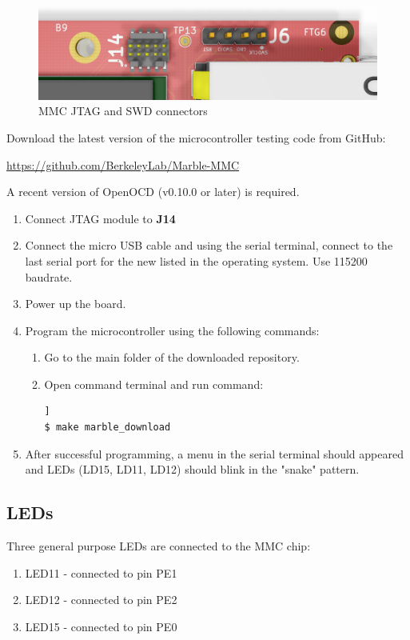 \documentclass[12pt,oneside,a4]{article}
\begin{document}
\begin{figure}[H]
\begin{center}
\includegraphics[width=1\linewidth]{mmcjtagswd.png}
 \caption{MMC JTAG and SWD connectors}\label{mmcjtagswd}
\end{center}
\end{figure}

Download the latest version of the microcontroller testing code from GitHub:
\begin{leftbar}
\url{https://github.com/BerkeleyLab/Marble-MMC}
\end{leftbar}

A recent version of OpenOCD (v0.10.0 or later) is required.
\begin{enumerate}
	\item Connect JTAG module to \textbf{J14}
	\item Connect the micro USB cable and using the serial terminal, connect to the last serial port for the new listed in the operating system. Use 115200 baudrate.
	\item Power up the board.
	\item Program the microcontroller using the following commands:
	\begin{enumerate}
	\item Go to the main folder of the downloaded repository.
	\item Open command terminal and run command:
	\begin{lstlisting}[backgroundcolor = \color{Gainsboro}, language=bash, frame=none]]
$ make marble_download
	\end{lstlisting}
	\end{enumerate}
	\item After successful programming, a menu in the serial terminal should appeared and LEDs (LD15, LD11, LD12) should blink in the "snake" pattern.
\end{enumerate}
\subsection{LEDs}
Three general purpose LEDs are connected to the MMC chip:
\begin{enumerate}
	\item LED11 - connected to pin PE1
	\item LED12 - connected to pin PE2
	\item LED15 - connected to pin PE0
\end{enumerate}
\end{document}
